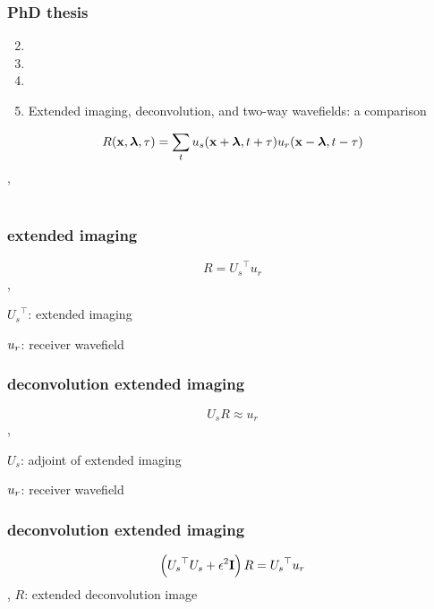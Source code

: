 \begin{frame} \frametitle{PhD thesis}
  \Large

  \begin{enumerate}
  \setcounter{enumi}{1}    
    \item {}
    \item {}
    \item {}
    \item Extended imaging, deconvolution, and two-way wavefields: a comparison
  \end{enumerate} 
\end{frame}







\begin{frame}
  \[
     R({\bf x},{\boldsymbol{\lambda}},\tau) =
     \sum_{t} u_s({\bf x}+{\boldsymbol{\lambda}},t+\tau) u_r({\bf x}-{\boldsymbol{\lambda}},t-\tau)
  \]
\sep  
   \\ 
  \\
\end{frame}





\begin{frame} \frametitle{ extended imaging}
 \[
  R = { U_s}^\top{u_r}
\]
\sep

${ U_s}^\top$: extended imaging 

${u_r}$: receiver  wavefield
\end{frame} 

\begin{frame} \frametitle{deconvolution extended imaging}
 \[
  { U_s} R \approx {u_r}
\]
\sep

${ U_s}$: adjoint of extended imaging 

${u_r}$: receiver wavefield
\end{frame} 

\begin{frame} \frametitle{deconvolution extended imaging}
\[
  \left ( { U_s}^\top{ U_s} +\epsilon^2 {\bf I}\right) R = {U_s}^\top {u_r}
\]
\sep
$R$: extended deconvolution image
\end{frame} 







